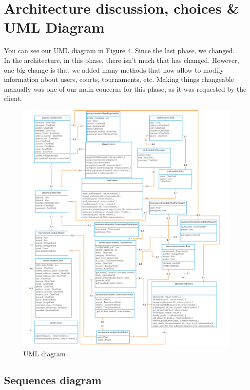 \documentclass[a4paper, 12pt]{article}
\begin{document}
\newpage
\section{Architecture discussion, choices \& UML Diagram}

You can see our UML diagram in Figure 4. Since the last phase, we changed.\\

In the architecture, in this phase, there isn't much that has changed. However, one big change is that we added many methods that now allow to modify information about users, courts, tournaments, etc. Making things changeable manually was one of our main coucerns for this phase, as it was requested by the client.

\begin{figure}[b]
	\centering
 	\caption{\label{uml} UML diagram}
	\includegraphics[scale=0.2]{Class.png}
\end{figure}

\subsection*{Sequences diagram}
\end{document}
